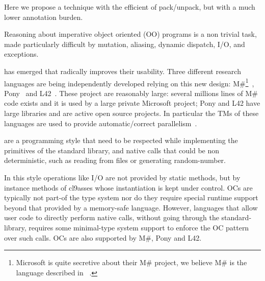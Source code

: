 Here we propose a technique with the efficient of pack/unpack, but with a much lower annotation burden.
\LINE

Reasoning about imperative object oriented (OO) programs is a non trivial task,
made particularly difficult by mutation, aliasing, dynamic dispatch, I/O, and exceptions. 

 has emerged that radically improves their usability.
Three different research languages are being independently developed relying on this new design: {M\#}\footnote{Microsoft is quite secretive about their M\# project, we believe M\# is the language described in ~\cite{?}.}~\cite{?}, Pony~\cite{?} and L42~\cite{?}.
These project are reasonably large: several millions lines of M\# code exists and it is used by a large private Microsoft project; Pony and L42 have large libraries and are active open source projects. In particular the TMs of these languages are used to provide automatic/correct parallelism~\cite{GordonEtAl12,clebsch2015deny,clebsch2017orca,?}.



 are a programming style that need to be respected while implementing the primitives of the standard library, and native calls that could be non deterministic, such as reading from files or generating random-number.

In this style operations like I/O are not provided by static methods, but by instance methods of cl9asses whose instantiation is kept under control.
OCs are typically not part-of the type system nor do they require special runtime support beyond that provided by a memory-safe language. However, languages that allow user code to directly perform native calls, without going through the standard-library, requires some minimal-type system support to enforce the OC pattern over such calls.
OCs are also supported by M\#, Pony and L42.



